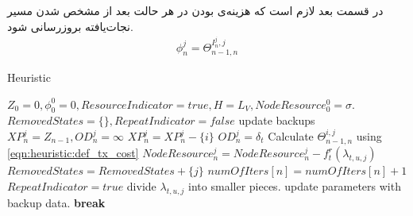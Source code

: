 در قسمت بعد لازم است که هزینه‌ی بودن در هر حالت بعد از مشخص شدن مسیر نجات‌یافته بروزرسانی شود. 
\begin{align}\label{eqn:heuristic:def_phi}
	\phi_n^j = \Theta_{n-1,n}^{I_n^j,j}
\end{align}

\begin{latin}
	\begin{algorithm}
		\caption{Heuristic}
		\label{alg:heuristic}
		\begin{algorithmic}[1]
			\State $Z_0 = 0, \phi_0^0 = 0, ResourceIndicator = true, H = L_V, NodeResource_0^0 = \sigma.$ 
			\label{eqn:alg_steps:heuristic_main_loop}
			\State $RemovedStates=\{\}, RepeatIndicator = false$
			\State update backups
			\EndIf	
			\State $XP_n^j=Z_{n-1}, OD_n^j = \infty$
			\State $XP_n^j = XP_n^j - \{i\}$
			\EndIf
			\EndFor
			\State $OD_n^j = \delta_t$
			\EndIf
			\State Calculate $\Theta_{n-1,n}^{i,j}$ using \cref{eqn:heuristic:def_tx_cost}
			\EndFor
			\State $NodeResource_n^j = NodeResource_n^j - f_t^r(\lambda_{t,u,j})$
			\EndIf
			\Else
			\State $RemovedStates = RemovedStates + \{j\}$
			\EndIf
			\EndFor
			\State $numOfIters[n] = numOfIters[n] + 1$
			\State $RepeatIndicator = true$
			\State divide $\lambda_{t,u,j}$ into smaller pieces.
			\State update parameters with backup data.
			\State \textbf{break}
			\EndIf
			\EndIf
		\end{algorithmic}
	\end{algorithm}
\end{latin}

